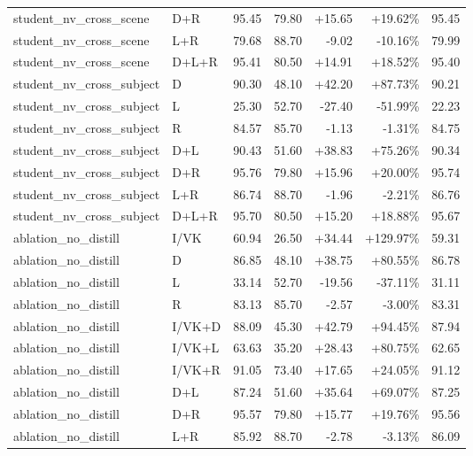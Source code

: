 \documentclass[UTF8,10pt,a4paper]{ctexart}
\newcommand{\better}[1]{\textcolor{ImpBlue}{#1}}
\newcommand{\worse}[1]{\textcolor{DropRed}{#1}}
\begin{document}
{\begin{longtable}{llrrrrr}
student\_nv\_cross\_scene & D+R & 95.45 & 79.80 & \better{+15.65} & \better{+19.62\%} & 95.45\\
student\_nv\_cross\_scene & L+R & 79.68 & 88.70 & \worse{-9.02} & \worse{-10.16\%} & 79.99\\
student\_nv\_cross\_scene & D+L+R & 95.41 & 80.50 & \better{+14.91} & \better{+18.52\%} & 95.40\\
student\_nv\_cross\_subject & D & 90.30 & 48.10 & \better{+42.20} & \better{+87.73\%} & 90.21\\
student\_nv\_cross\_subject & L & 25.30 & 52.70 & \worse{-27.40} & \worse{-51.99\%} & 22.23\\
student\_nv\_cross\_subject & R & 84.57 & 85.70 & \worse{-1.13} & \worse{-1.31\%} & 84.75\\
student\_nv\_cross\_subject & D+L & 90.43 & 51.60 & \better{+38.83} & \better{+75.26\%} & 90.34\\
student\_nv\_cross\_subject & D+R & 95.76 & 79.80 & \better{+15.96} & \better{+20.00\%} & 95.74\\
student\_nv\_cross\_subject & L+R & 86.74 & 88.70 & \worse{-1.96} & \worse{-2.21\%} & 86.76\\
student\_nv\_cross\_subject & D+L+R & 95.70 & 80.50 & \better{+15.20} & \better{+18.88\%} & 95.67\\
ablation\_no\_distill & I/VK & 60.94 & 26.50 & \better{+34.44} & \better{+129.97\%} & 59.31\\
ablation\_no\_distill & D & 86.85 & 48.10 & \better{+38.75} & \better{+80.55\%} & 86.78\\
ablation\_no\_distill & L & 33.14 & 52.70 & \worse{-19.56} & \worse{-37.11\%} & 31.11\\
ablation\_no\_distill & R & 83.13 & 85.70 & \worse{-2.57} & \worse{-3.00\%} & 83.31\\
ablation\_no\_distill & I/VK+D & 88.09 & 45.30 & \better{+42.79} & \better{+94.45\%} & 87.94\\
ablation\_no\_distill & I/VK+L & 63.63 & 35.20 & \better{+28.43} & \better{+80.75\%} & 62.65\\
ablation\_no\_distill & I/VK+R & 91.05 & 73.40 & \better{+17.65} & \better{+24.05\%} & 91.12\\
ablation\_no\_distill & D+L & 87.24 & 51.60 & \better{+35.64} & \better{+69.07\%} & 87.25\\
ablation\_no\_distill & D+R & 95.57 & 79.80 & \better{+15.77} & \better{+19.76\%} & 95.56\\
ablation\_no\_distill & L+R & 85.92 & 88.70 & \worse{-2.78} & \worse{-3.13\%} & 86.09\\

\end{longtable}}
\end{document}
